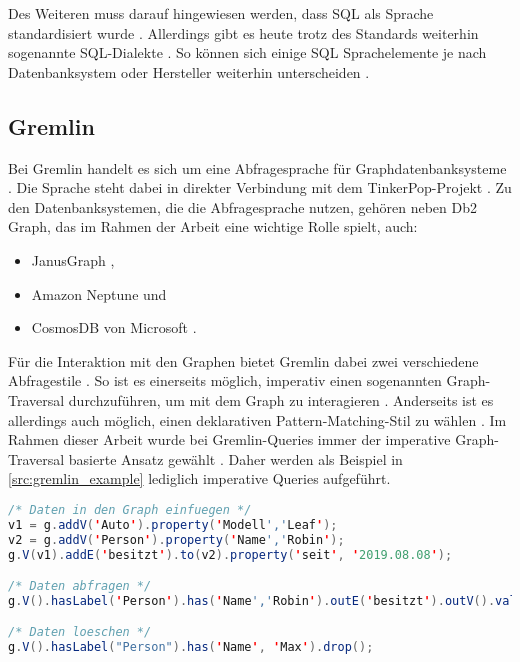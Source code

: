 Des Weiteren muss darauf hingewiesen werden, dass SQL als Sprache standardisiert wurde \cite{sql_history}. Allerdings gibt es heute trotz des Standards weiterhin sogenannte SQL-Dialekte \cite{sql_2017}. So können sich einige SQL Sprachelemente je nach Datenbanksystem oder Hersteller weiterhin unterscheiden \cite{sql_2017}. 

\subsection{Gremlin}

Bei Gremlin handelt es sich um eine Abfragesprache für  Graphdatenbanksysteme \cite{tinkerpop_2020}. Die Sprache steht dabei in direkter Verbindung mit dem TinkerPop-Projekt  \cite{tinkerpop_2020}. Zu den Datenbanksystemen, die die Abfragesprache nutzen, gehören neben Db2 Graph, das im Rahmen der Arbeit eine wichtige Rolle spielt, auch:
\begin{itemize}
    \item JanusGraph \cite{janusgraph_2020},
    \item Amazon Neptune \cite{neptune_2021} und 
    \item CosmosDB von Microsoft \cite{cosmosdb_2021}.
\end{itemize}

Für die Interaktion mit den Graphen bietet Gremlin dabei zwei verschiedene Abfragestile \cite{gremlin_paper}. So ist es einerseits möglich, imperativ einen sogenannten Graph-Traversal durchzuführen, um mit dem Graph zu interagieren \cite{gremlin_paper}. Anderseits ist es allerdings auch möglich, einen deklarativen Pattern-Matching-Stil zu wählen \cite{gremlin_paper}. Im Rahmen dieser Arbeit wurde bei Gremlin-Queries immer der imperative Graph-Traversal basierte Ansatz gewählt \cite{gremlin_paper}. Daher werden als Beispiel in \autoref{src:gremlin_example} lediglich imperative Queries aufgeführt. 

\begin{lstlisting}[caption={Beispiel Gremlin-Queries},language=JAVA,label=src:gremlin_example]
/* Daten in den Graph einfuegen */
v1 = g.addV('Auto').property('Modell','Leaf');
v2 = g.addV('Person').property('Name','Robin');
g.V(v1).addE('besitzt').to(v2).property('seit', '2019.08.08');

/* Daten abfragen */
g.V().hasLabel('Person').has('Name','Robin').outE('besitzt').outV().values('Modell')

/* Daten loeschen */
g.V().hasLabel("Person").has('Name', 'Max').drop();
\end{lstlisting}

